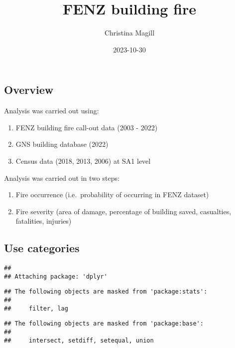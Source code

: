 \documentclass[
]{article}
\title{FENZ building fire}
\author{Christina Magill}
\date{2023-10-30}
\providecommand{\tightlist}{%
  \setlength{\itemsep}{0pt}\setlength{\parskip}{0pt}}
\begin{document}
\maketitle

\hypertarget{overview}{%
\subsection{Overview}\label{overview}}

Analysis was carried out using:

\begin{enumerate}
\def\labelenumi{\arabic{enumi}.}
\tightlist
\item
  FENZ building fire call-out data (2003 - 2022)
\item
  GNS building database (2022)
\item
  Census data (2018, 2013, 2006) at SA1 level
\end{enumerate}

Analysis was carried out in two steps:

\begin{enumerate}
\def\labelenumi{\arabic{enumi}.}
\tightlist
\item
  Fire occurrence (i.e.~probability of occurring in FENZ dataset)
\item
  Fire severity (area of damage, percentage of building saved,
  casualties, fatalities, injuries)
\end{enumerate}

\hypertarget{use-categories}{%
\subsection{Use categories}\label{use-categories}}

\begin{verbatim}
## 
## Attaching package: 'dplyr'
\end{verbatim}

\begin{verbatim}
## The following objects are masked from 'package:stats':
## 
##     filter, lag
\end{verbatim}

\begin{verbatim}
## The following objects are masked from 'package:base':
## 
##     intersect, setdiff, setequal, union
\end{verbatim}
\end{document}
